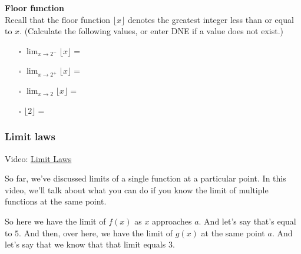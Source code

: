 \documentclass[pdftex, brazil, 12pt, twoside]{article}
\begin{document}
\begin{exercise}
  \textbf{ Floor function}\\
  Recall that the floor function $\lfloor{x}\rfloor$ denotes the greatest integer less than or equal to $x$.
  (Calculate the following values, or enter DNE if a value does not exist.)
  \begin{figure}[H]
    \begin{center}
    \end{center}
  \end{figure}  
  \begin{itemize}
  \item[$\square$] $\displaystyle \lim_{x \to 2^-}\lfloor x \rfloor =$
  \item[$\square$] $\displaystyle \lim_{x \to 2^+}\lfloor x \rfloor =$
  \item[$\square$] $\displaystyle \lim_{x \to 2}\lfloor x \rfloor =$
  \item[$\square$] $\lfloor 2 \rfloor =$
  \end{itemize}
\end{exercise}

\subsubsection{Limit laws}
\label{u0-intro-laws}

Video: \href{https://www.youtube.com/watch?v=WQF7svQblQk}{Limit Laws}

So far, we've discussed limits of a single function at a particular point.
In this video, we'll talk about what you can do if you know the limit of multiple
functions at the same point.

So here we have the limit of $f(x)$ as $x$ approaches $a$.
And let's say that's equal to $5$.
And then, over here, we have the limit
of $g(x)$ at the same point $a$.
And let's say that we know that that limit equals $3$.
\end{document}
